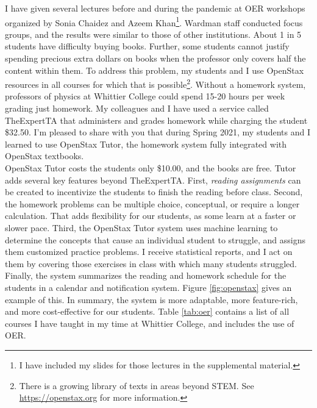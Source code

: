 \documentclass[../../../main.tex]{subfiles}
\begin{document}
I have given several lectures before and during the pandemic at OER workshops organized by Sonia Chaidez and Azeem Khan\footnote{I have included my slides for those lectures in the supplemental material.}.  Wardman staff conducted focus groups, and the results were similar to those of other institutions.  About 1 in 5 students have difficulty buying books.  Further, some students cannot justify spending precious extra dollars on books when the professor only covers half the content within them.  To address this problem, my students and I use OpenStax resources in all courses for which that is possible\footnote{There is a growing library of texts in areas beyond STEM.  See \url{https://openstax.org} for more information.}.  Without a homework system, professors of physics at Whittier College could spend 15-20 hours per week grading just homework.  My colleagues and I have used a service called TheExpertTA that administers and grades homework while charging the student \$32.50.  I'm pleased to share with you that during Spring 2021, my students and I learned to use OpenStax Tutor, the homework system fully integrated with OpenStax textbooks.
\\
\vspace{0.25cm}
OpenStax Tutor costs the students only \$10.00, and the books are free.  Tutor adds several key features beyond TheExpertTA.  First, \textit{reading assignments} can be created to incentivize the students to finish the reading before class.  Second, the homework problems can be multiple choice, conceptual, or require a longer calculation.  That adds flexibility for our students, as some learn at a faster or slower pace.  Third, the OpenStax Tutor system uses machine learning to determine the concepts that cause an individual student to struggle, and assigns them customized practice problems.  I receive statistical reports, and I act on them by covering those exercises in class with which many students struggled.  Finally, the system summarizes the reading and homework schedule for the students in a calendar and notification system.  Figure \ref{fig:openstax} gives an example of this.  In summary, the system is more adaptable, more feature-rich, and more cost-effective for our students.  Table \ref{tab:oer} contains a list of all courses I have taught in my time at Whittier College, and includes the use of OER.
\\
\vspace{0.25cm}
\end{document}
